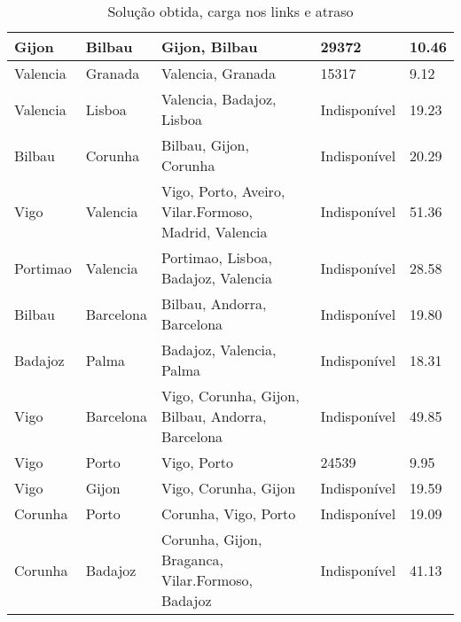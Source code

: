\begin{table}[!htb]
{\begin{tabular}{|l|l|l|l|l|}
Gijon & Bilbau & Gijon, Bilbau & 29372 & 10.46 \\ \hline
Valencia & Granada & Valencia, Granada & 15317 & 9.12 \\ \hline
Valencia & Lisboa & Valencia, Badajoz, Lisboa & Indisponível & 19.23 \\ \hline
Bilbau & Corunha & Bilbau, Gijon, Corunha & Indisponível & 20.29 \\ \hline
Vigo & Valencia & Vigo, Porto, Aveiro, Vilar.Formoso, Madrid, Valencia & Indisponível & 51.36 \\ \hline
Portimao & Valencia & Portimao, Lisboa, Badajoz, Valencia & Indisponível & 28.58 \\ \hline
Bilbau & Barcelona & Bilbau, Andorra, Barcelona & Indisponível & 19.80 \\ \hline
Badajoz & Palma & Badajoz, Valencia, Palma & Indisponível & 18.31 \\ \hline
Vigo & Barcelona & Vigo, Corunha, Gijon, Bilbau, Andorra, Barcelona & Indisponível & 49.85 \\ \hline
Vigo & Porto & Vigo, Porto & 24539 & 9.95 \\ \hline
Vigo & Gijon & Vigo, Corunha, Gijon & Indisponível & 19.59 \\ \hline
Corunha & Porto & Corunha, Vigo, Porto & Indisponível & 19.09 \\ \hline
Corunha & Badajoz & Corunha, Gijon, Braganca, Vilar.Formoso, Badajoz & Indisponível & 41.13 \\ \hline
\end{tabular}}
\caption[]{Solução obtida, carga nos links e atraso}
\end{table}

